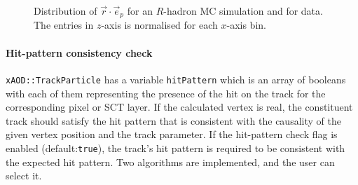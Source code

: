 \documentclass[NOTE, atlasdraft=true, texlive=2018, UKenglish]{\ATLASLATEXPATH atlasdoc}
\begin{document}
\begin{figure}[t]
\begin{center}
\caption{Distribution of $\vec{r}\cdot\vec{e}_{p}$ for  an $R$-hadron MC simulation and  for data. The entries in $z$-axis is normalised for each $x$-axis bin.}
\label{fig:vPosDist}
\end{center}
\end{figure}


\paragraph{Hit-pattern consistency check}
          {\tt xAOD::TrackParticle} has a variable {\tt hitPattern} which is an array of booleans with each of them representing the presence of the hit on the track for the corresponding pixel or SCT layer. If the calculated vertex is real, the constituent track should satisfy the hit pattern that is consistent with the causality of the given vertex position and the track parameter. If the hit-pattern check flag is enabled (default:{\tt true}), the track's hit pattern is required to be consistent with the expected hit pattern. Two algorithms are implemented, and the user can select it.
          
\end{document}
